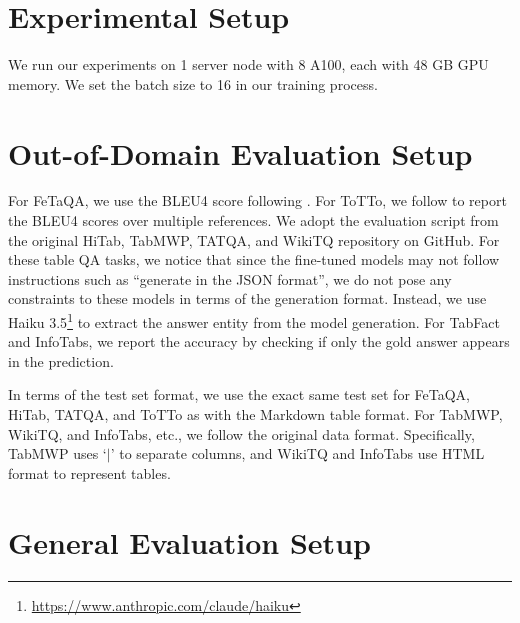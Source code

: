 \documentclass[11pt]{article}
\begin{document}

% 

\newpage
\appendix
\newpage

\section{Experimental Setup}
\label{app-sec: experimental-setup}

We run our experiments on 1 server node with 8 A100, each with 48 GB GPU memory.
We set the batch size to 16 in our training process.


\section{Out-of-Domain Evaluation Setup}
\label{app-sec: out-real-world-setup}
For FeTaQA, we use the BLEU4 score following \citet{nan-etal-2022-fetaqa}.
For ToTTo, we follow \citet{xie-etal-2022-unifiedskg} to report the BLEU4 scores over multiple references.
We adopt the evaluation script from the original HiTab, TabMWP, TATQA, and WikiTQ repository on GitHub.
For these table QA tasks, we notice that since the fine-tuned models may not follow instructions such as ``generate in the JSON format'', we do not pose any constraints to these models in terms of the generation format.
Instead, we use Haiku 3.5\footnote{\url{https://www.anthropic.com/claude/haiku}} to extract the answer entity from the model generation. 
For TabFact and InfoTabs, we report the accuracy by checking if only the gold answer appears in the prediction.


In terms of the test set format, we use the exact same test set for FeTaQA, HiTab, TATQA, and ToTTo as \citet{zhang-etal-2024-tablellama} with the Markdown table format.
For TabMWP, WikiTQ, and InfoTabs, etc., we follow the original data format.
Specifically, TabMWP uses `$|$' to separate columns, and WikiTQ and InfoTabs use HTML format to represent tables.

\section{General Evaluation Setup}
\label{app-sec: general-benchmark-eval-setup}
\end{document}
